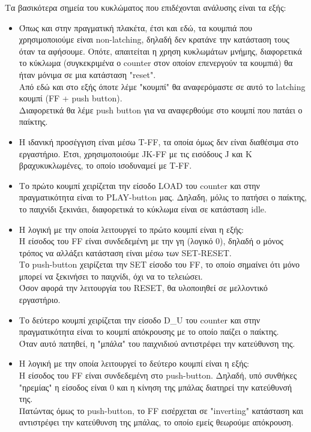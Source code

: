 \documentclass[12pt]{article}
\begin{document}
Τα βασικότερα σημεία του κυκλώματος που επιδέχονται ανάλυσης είναι τα εξής:
\begin{itemize}

    \item Όπως και στην πραγματική πλακέτα, έτσι και εδώ, τα κουμπιά που χρησιμοποιούμε είναι non-latching, δηλαδή δεν κρατάνε την κατάσταση τους όταν τα αφήσουμε.
          Οπότε, απαιτείται η χρηση κυκλωμάτων μνήμης, διαφορετικά το κύκλωμα (συγκεκριμένα ο counter στον οποίον επενεργούν τα κουμπιά) θα ήταν μόνιμα σε μια κατάσταση "reset".\\
          Από εδώ και στο εξής όποτε λέμε "κουμπί" θα αναφερόμαστε σε αυτό το latching κουμπί (FF + push button). \\
          Διαφορετικά θα λέμε push button για να αναφερθούμε στο κουμπί που πατάει ο παίκτης.

    \item Η ιδανική προσέγγιση είναι μέσω T-FF, τα οποία όμως δεν είναι διαθέσιμα στο εργαστήριο. 
          Έτσι, χρησιμοποιούμε JK-FF με τις εισόδους J και K βραχυκυκλωμένες, το οποίο ισοδυναμεί με T-FF.

    \item Το πρώτο κουμπί χειρίζεται την είσοδο LOAD του counter και στην πραγματικότητα είναι το PLAY-button μας.
          Δηλαδη, μόλις το πατήσει ο παίκτης, το παιχνίδι ξεκινάει, διαφορετικά το κύκλωμα είναι σε κατάσταση idle.

    \item Η λογική με την οποία λειτουργεί το πρώτο κουμπί είναι η εξής: \\
          Η είσοδος του FF είναι συνδεδεμένη με την γη (λογικό 0), δηλαδή ο μόνος τρόπος να αλλάξει κατάσταση είναι μέσω των SET-RESET.\\
          Το push-button χειρίζεται την SET είσοδο του FF, το οποίο σημαίνει ότι μόνο μπορεί να ξεκινήσει το παιχνίδι, όχι να το τελειώσει. \\
          Όσον αφορά την λειτουργία του RESET, θα υλοποιηθεί σε μελλοντικό εργαστήριο.

    \item Το δεύτερο κουμπί χειρίζεται την είσοδο D\_U του counter και στην πραγματικότητα είναι το κουμπί απόκρουσης με το οποίο παίζει ο παίκτης. \\
          Όταν αυτό πατηθεί, η "μπάλα" του παιχνιδιού αντιστρέφει την κατεύθυνση της.

    \item Η λογική με την οποία λειτουργεί το δεύτερο κουμπί είναι η εξής: \\    
          Η είσοδος του FF είναι συνδεδεμένη στο push-button. Δηλαδή, υπό συνθήκες "ηρεμίας" η είσοδος είναι 0 και η κίνηση της μπάλας διατηρεί την κατεύθυνσή της. \\
          Πατώντας όμως το push-button, το FF εισέρχεται σε "inverting" κατάσταση και αντιστρέφει την κατεύθυνση της μπάλας, το οποίο εμείς θεωρούμε απόκρουση.

\end{itemize}     
     
\end{document}

